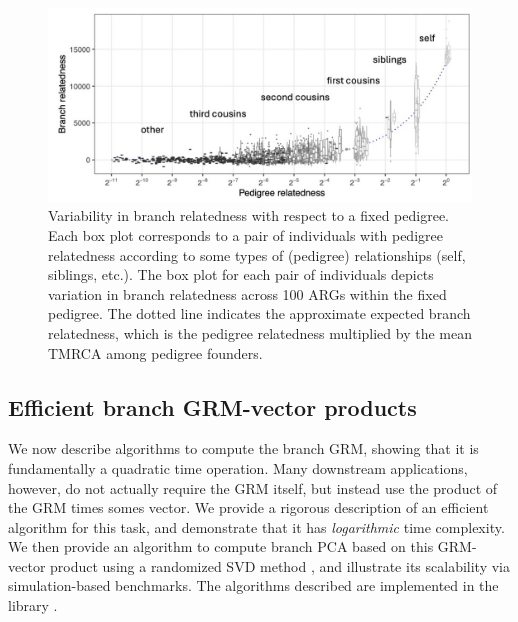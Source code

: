 \begin{figure}
    \centering
    \includegraphics[width=\textwidth]{Figures/Fig5_branch_recap_sim_boxplot_combined_behind2.jpg}
    \caption{Variability in branch relatedness with respect to a fixed pedigree.
    Each box plot corresponds to a pair of individuals with pedigree relatedness
    according to some types of (pedigree) relationships (self, siblings, etc.).
    The box plot for each pair of individuals depicts variation in branch relatedness across 100 ARGs within the fixed pedigree.
    The dotted line indicates the approximate expected branch relatedness,
    which is the pedigree relatedness multiplied by the mean TMRCA among pedigree founders.}
    \label{fig:boxplots}
\end{figure}



% 


\subsection{Efficient branch GRM-vector products}\label{subsec:matvec}

We now describe algorithms to compute the branch GRM, showing that it is 
fundamentally a quadratic time operation. Many downstream applications, however,
do not actually require the GRM itself, but instead use the product of the 
GRM times somes vector. We provide a rigorous description of an efficient 
algorithm for this task, and demonstrate that it has \emph{logarithmic} time complexity.
We then provide an algorithm to compute branch PCA based on this GRM-vector
product using a randomized SVD method \citep{halko2011findingstructure},
and illustrate its scalability
via simulation-based benchmarks.
The algorithms described are implemented in
the \tskit{} library \citep{ralph2020efficiently, kelleher2024tskit}.

